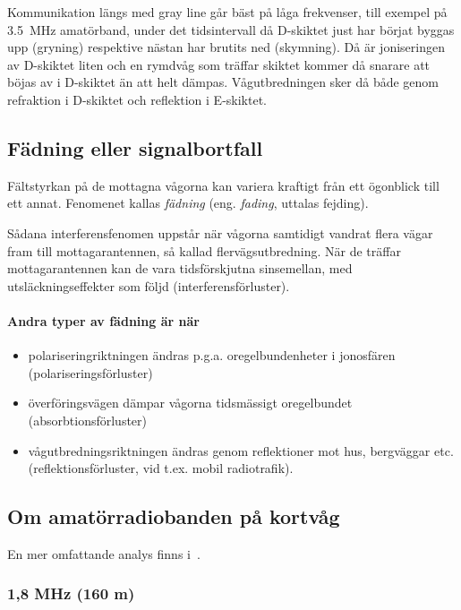 Kommunikation längs med gray line går bäst på låga frekvenser, till exempel på
\qty{3,5}{\mega\hertz} amatörband, under det tidsintervall då D-skiktet just
har börjat byggas upp (gryning) respektive nästan har brutits ned (skymning).
Då är joniseringen av D-skiktet liten och en rymdvåg som
träffar skiktet kommer då snarare att böjas av i D-skiktet än att helt dämpas.
Vågutbredningen sker då både genom refraktion i D-skiktet och reflektion i
E-skiktet.

\subsection{Fädning eller signalbortfall}
\label{subsec:faedning}

Fältstyrkan på de mottagna vågorna kan variera kraftigt från ett ögonblick till
ett annat.
Fenomenet kallas \emph{fädning} (eng. \emph{fading}, uttalas fejding).

Sådana interferensfenomen uppstår när vågorna samtidigt vandrat flera
vägar fram till mottagarantennen, så kallad flervägsutbredning.
När de träffar mottagarantennen kan de vara tidsförskjutna sinsemellan, med
utsläckningseffekter som följd (interferensförluster).

\paragraph{Andra typer av fädning är när}
\begin{itemize}
\item polariseringriktningen ändras p.g.a. oregelbundenheter i
  jonosfären (polariseringsförluster)
\item överföringsvägen dämpar vågorna tidsmässigt oregelbundet
  (absorbtionsförluster)
\item vågutbredningsriktningen ändras genom reflektioner mot hus,
  bergväggar etc. (reflektionsförluster, vid t.ex. mobil radiotrafik).
\end{itemize}

\subsection{Om amatörradiobanden på kortvåg}
\label{om_kortvågsbanden}

En mer omfattande analys finns i~\cite{ARRLHDB2015}.

\subsubsection{1,8 MHz (160 m)}

